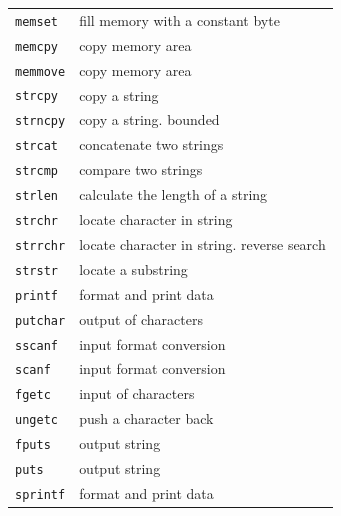 \documentclass[a4paper,10pt,twoside]{report}
\begin{document}
\begin{longtable}{|l|l|}
\texttt{memset} & fill memory with a constant byte\\
\texttt{memcpy} & copy memory area\\
\texttt{memmove} & copy memory area\\
\texttt{strcpy} & copy a string\\
\texttt{strncpy} & copy a string. bounded \\
\texttt{strcat} & concatenate two strings\\
\texttt{strcmp} & compare two strings\\
\texttt{strlen} & calculate the length of a string\\
\texttt{strchr} & locate character in string\\
\texttt{strrchr} & locate character in string. reverse search \\
\texttt{strstr} & locate a substring\\ \hline


\texttt{printf} & format and print data\\
\texttt{putchar} &output of characters \\
\texttt{sscanf} & input format conversion\\
\texttt{scanf} & input format conversion\\
\texttt{fgetc} & input of characters\\
\texttt{ungetc} & push a character back\\
\texttt{fputs} & output string\\
\texttt{puts} & output string\\
\texttt{sprintf} & format and print data\\ \hline
\end{longtable}
\end{document}
